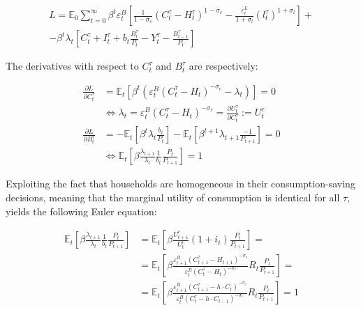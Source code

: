 \documentclass{pracamgr}
\numberwithin{equation}{section}
\begin{document}
\begin{equation}
\begin{split}
L = \mathbb{E}_{0} \sum\limits_{t=0}^{\infty} \beta^{t} \varepsilon_{t}^{B} \left[ \frac{1}{1-\sigma_{c}} \left( C_{t}^{\tau} - H_{t}^{\tau} \right)^{1-\sigma_{c}} - \frac{\varepsilon_{t}^{L}}{1+\sigma_{l}} \left( l_{t}^{\tau} \right)^{1+\sigma_{l}} \right] + \\
- \beta^{t} \lambda_{t} \left[ C_{t}^{\tau} + I_{t}^{\tau} + b_{t} \frac{B_{t}^{\tau}}{P_{t}} - Y_{t}^{\tau} - \frac{B_{t-1}^{\tau}}{P_{t}} \right]
\end{split}
\end{equation}

The derivatives with respect to $C_{t}^{\tau}$ and $B_{t}^{\tau}$ are respectively:

\begin{align}
\frac{\partial L}{\partial C_{t}^{\tau}} &= \mathbb{E}_{t} \left[ \beta^{t} \left( \varepsilon_{t}^{B} (
C_{t}^{\tau} - H_{t} )^{-\sigma_{c}} - \lambda_{t} \right) \right]  = 0  \nonumber \\ 
& \iff \lambda_{t} =  \varepsilon_{t}^{B} (C_{t}^{\tau} - H_{t} )^{-\sigma_{c}} = \frac{\partial U_{t}^{\tau}}{\partial C_{t}^{\tau}} := U_{t}^{c} \label{FOC_C} \\
\frac{\partial L}{\partial B_{t}^{\tau}} &= -\mathbb{E}_{t} \left[ \beta^{t} \lambda_{t} \frac{b_{t}}{P_{t}} \right] - \mathbb{E}_{t} \left[ \beta^{t+1} \lambda_{t+1} \frac{-1}{P_{t+1}} \right] = 0 \nonumber \\
& \iff \mathbb{E}_{t} \left[ \beta \frac{\lambda_{t+1}}{\lambda_{t}} \frac{1}{b_{t}} \frac{P_{t}}{P_{t+1}} \right] = 1 \label{FOC_B} 
\end{align}

Exploiting the fact that households are homogeneous in their consumption-saving decisions,  meaning that the marginal utility of consumption is identical for all $\tau$, yields the following Euler equation:

\begin{align}
\mathbb{E}_{t} \left[ \beta \frac{\lambda_{t+1}}{\lambda_{t}} \frac{1}{b_{t}}\frac{P_{t}}{P_{t+1}} \right] &= \mathbb{E}_{t} \left[ \beta \frac{U^{c}_{t+1}}{U^{c}_{t}} (1 + i_{t}) \frac{P_{t}}{P_{t+1}} \right] = \nonumber \\
&= \mathbb{E}_{t} \left[ \beta \frac{\varepsilon_{t+1}^{B} (C_{t+1}^{\tau} - H_{t+1} )^{-\sigma_{c}}}{\varepsilon_{t}^{B} (C_{t}^{\tau} - H_{t} )^{-\sigma_{c}}} R_{t} \frac{P_{t}}{P_{t+1}} \right] = \nonumber \\
&= \mathbb{E}_{t} \left[ \beta \frac{\varepsilon_{t+1}^{B} (C_{t+1}^{\tau} - h \cdot C_{t} )^{-\sigma_{c}}}{\varepsilon_{t}^{B} (C_{t}^{\tau} - h \cdot C_{t-1} )^{-\sigma_{c}}} R_{t} \frac{P_{t}}{P_{t+1}} \right] = 1
\end{align}
\end{document}
